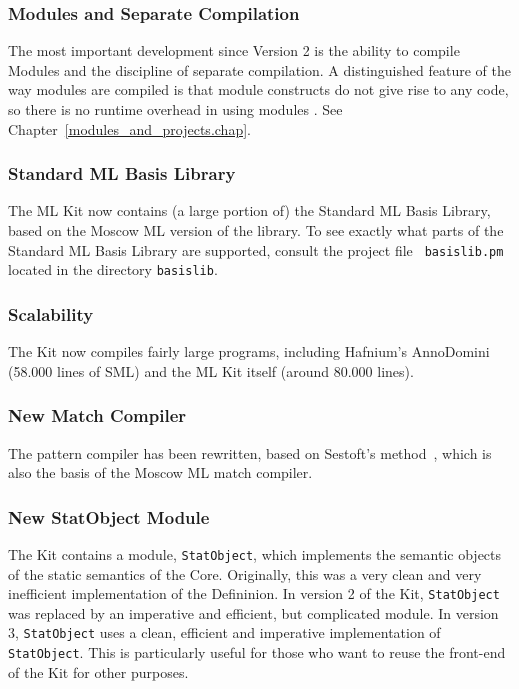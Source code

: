 \documentclass[12pt]{book}
\begin{document}
\subsubsection*{Modules and Separate Compilation}
The most important development since Version 2 is the ability to
compile Modules and the discipline of separate compilation. A
distinguished feature of the way modules are compiled is that module
constructs do not give rise to any code, so there is no runtime
overhead in using modules \cite{ElsmanICFP99,ElsmanThesis}. See
Chapter~\ref{modules_and_projects.chap}.

\subsubsection*{Standard ML Basis Library}
The ML Kit now contains (a large portion of) the  Standard ML Basis Library, based on the Moscow ML
version of the library. To see exactly what parts of the Standard ML
Basis Library are supported, consult the project file {\tt
  basislib.pm} located in the directory {\tt basislib}.

\subsubsection*{Scalability}
The Kit now compiles fairly large programs, including Hafnium's AnnoDomini
(58.000 lines of SML) and the ML Kit itself (around 80.000 lines).

\subsubsection*{New Match Compiler}
The pattern compiler has been rewritten, based on Sestoft's 
method~\cite{sestoft96}, which is also the basis of the Moscow ML 
match compiler. 

\subsubsection*{New StatObject Module}
The Kit contains a module, 
%
{\tt StatObject}, which implements the semantic objects of the static
semantics of the Core.  Originally, this was a very clean and very
inefficient implementation of the Defininion. In version 2 of the Kit,
{\tt StatObject} was replaced by an imperative and efficient, but
complicated module.  In version 3, {\tt StatObject} uses a clean,
efficient and imperative implementation of {\tt StatObject}. This is
particularly useful for those who want to reuse the front-end of the
Kit for other purposes.
\end{document}
